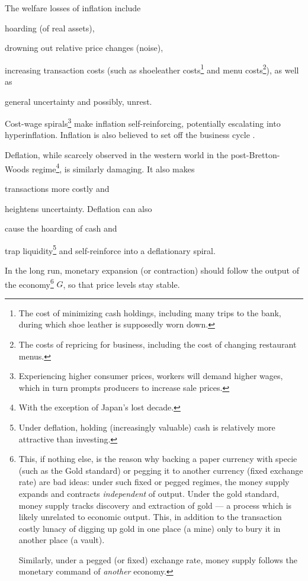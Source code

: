 The welfare losses of inflation include \begin{inparaenum}
	\item hoarding (of real assets), 
	\item drowning out relative price changes (noise), 
	\item increasing transaction costs (such as shoeleather costs\footnote{
		The cost of minimizing cash holdings, including many trips to the bank, during which shoe leather is supposedly worn down.} 
		and menu costs\footnote{
			The costs of repricing for business, including the cost of changing restaurant menus.}), 
		as well as 
	\item general uncertainty and possibly, unrest. 
	\end{inparaenum}
Cost-wage spirals\footnote{
	Experiencing higher consumer prices, workers will demand higher wages, which in turn prompts producers to increase sale prices.} 
make inflation self-reinforcing, potentially escalating into hyperinflation. Inflation is also believed to set off the business cycle \citep{Friedman1970}. 

Deflation, while scarcely observed in the western world in the post-Bretton-Woods regime\footnote{
	With the exception of Japan's lost decade.}, %
is similarly damaging. It also makes \begin{inparaenum}[\itshape 1\upshape)]
	\item transactions more costly and 
	\item heightens uncertainty. Deflation can also 
	\item cause the hoarding of cash and 
	\item trap liquidity\footnote{
		Under deflation, holding (increasingly valuable) cash is relatively more attractive than investing.} 
	and self-reinforce into a deflationary spiral.
	\end{inparaenum}

In the long run, monetary expansion (or contraction) should follow the output of the economy\footnote{
	This, if nothing else, is the reason why backing a paper currency with specie (such as the Gold standard) or pegging it to another currency (fixed exchange rate) are bad ideas: under such fixed or pegged regimes, the money supply expands and contracts \emph{independent} of output. Under the gold standard, money supply tracks discovery and extraction of gold --- a process which is likely unrelated to economic output. This, in addition to the transaction costly lunacy of digging up gold in one place (a mine) only to bury it in another place (a vault).
	
	Similarly, under a pegged (or fixed) exchange rate, money supply follows the monetary command of \emph{another} economy.} 
$G$, so that price levels stay stable.


